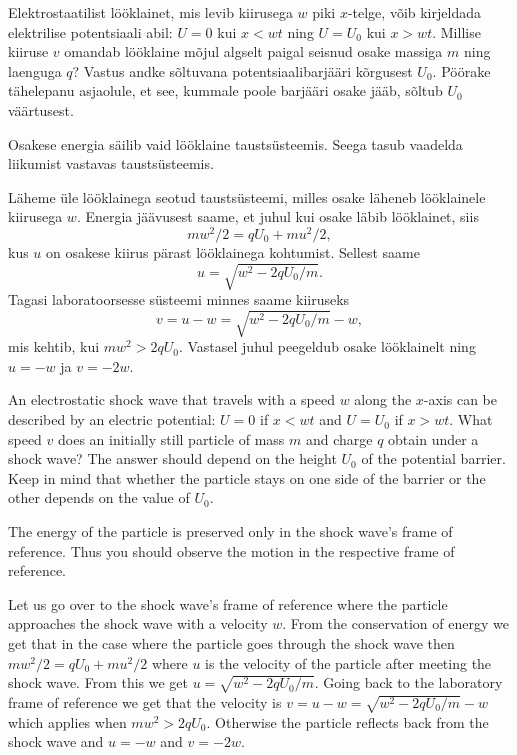 
Elektrostaatilist lööklainet, mis levib kiirusega $w$ piki $x$-telge, võib kirjeldada elektrilise potentsiaali abil: $U=0$ kui $x<wt$ ning $U=U_0$ kui $x>wt$. Millise kiiruse $v$ omandab lööklaine mõjul algselt paigal seisnud osake massiga $m$ ning laenguga $q$? Vastus andke sõltuvana potentsiaalibarjääri kõrgusest $U_0$. Pöörake tähelepanu asjaolule, et see, kummale poole barjääri osake jääb, sõltub $U_0$ väärtusest. 

\hint
Osakese energia säilib vaid lööklaine taustsüsteemis. Seega tasub vaadelda liikumist vastavas taustsüsteemis.

\solu
Läheme üle lööklainega seotud taustsüsteemi, milles osake läheneb lööklainele kiirusega $w$. Energia jäävusest saame, et juhul kui osake läbib lööklainet, siis 
\[
mw^2/2=qU_0+mu^2/2,
\]
kus $u$ on osakese kiirus pärast lööklainega kohtumist. Sellest saame
\[
u=\sqrt{w^2-2qU_0/m}.
\]
Tagasi laboratoorsesse süsteemi 
minnes saame kiiruseks
\[
v=u-w=\sqrt{w^2-2qU_0/m}-w,
\]
mis kehtib, kui $mw^2>2qU_0$. Vastasel juhul peegeldub osake lööklainelt ning
$u=-w$ ja $v=-2w$.

An electrostatic shock wave that travels with a speed $w$ along the $x$-axis can be described by an electric potential: $U=0$ if $x<wt$ and $U=U_0$ if $x>wt$. What speed $v$ does an initially still particle of mass $m$ and charge $q$ obtain under a shock wave? The answer should depend on the height $U_0$ of the potential barrier. Keep in mind that whether the particle stays on one side of the barrier or the other depends on the value of $U_0$.

\hinteng
The energy of the particle is preserved only in the shock wave’s frame of reference. Thus you should observe the motion in the respective frame of reference.

\solueng
Let us go over to the shock wave's frame of reference where the particle approaches the shock wave with a velocity $w$. From the conservation of energy we get that in the case where the particle goes through the shock wave then $mw^2/2=qU_0+mu^2/2$ where $u$ is the velocity of the particle after meeting the shock wave. From this we get $u=\sqrt{w^2-2qU_0/m}$. Going back to the laboratory frame of reference we get that the velocity is $v=u-w=\sqrt{w^2-2qU_0/m}-w$ which applies when $mw^2>2qU_0$. Otherwise the particle reflects back from the shock wave and $u=-w$ and $v=-2w$.
\probend